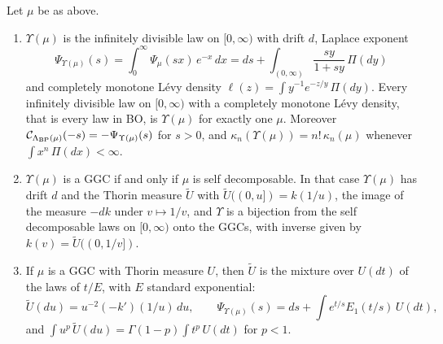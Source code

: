 \begin{proposition}\label{prop:wigfree:ups}
Let $\mu$ be as above.
\begin{enumerate}
\item[(a)] $\Upsilon(\mu)$ is the infinitely divisible law on $[0,\infty)$ with drift $d$, Laplace exponent
\begin{equation}\label{eq:wigfree:upspsi}
\Psi_{\Upsilon(\mu)}(s)=\int_0^\infty\Psi_\mu(sx)\,e^{-x}\,dx=ds+\int_{(0,\infty)}\frac{sy}{1+sy}\,\Pi(dy)
\end{equation}
and completely monotone L\'evy density $\ell(z)=\int y^{-1}e^{-z/y}\,\Pi(dy)$. Every infinitely divisible law on $[0,\infty)$ with a completely monotone L\'evy density, that is every law in BO, is $\Upsilon(\mu)$ for exactly one $\mu$. Moreover $\mathcal C_{\Lambda_{\rm BP}(\mu)}(-s)=-\Psi_{\Upsilon(\mu)}(s)$ for $s>0$, and $\kappa_n(\Upsilon(\mu))=n!\,\kappa_n(\mu)$ whenever $\int x^n\,\Pi(dx)<\infty$.
\item[(b)] $\Upsilon(\mu)$ is a GGC if and only if $\mu$ is self decomposable. In that case $\Upsilon(\mu)$ has drift $d$ and the Thorin measure $\widetilde U$ with $\widetilde U((0,u])=k(1/u)$, the image of the measure $-dk$ under $v\mapsto1/v$, and $\Upsilon$ is a bijection from the self decomposable laws on $[0,\infty)$ onto the GGCs, with inverse given by $k(v)=\widetilde U((0,1/v])$.
\item[(c)] If $\mu$ is a GGC with Thorin measure $U$, then $\widetilde U$ is the mixture over $U(dt)$ of the laws of $t/E$, with $E$ standard exponential:
\begin{equation}\label{eq:wigfree:utilde}
\widetilde U(du)=u^{-2}(-k')(1/u)\,du,\qquad\Psi_{\Upsilon(\mu)}(s)=ds+\int e^{t/s}E_1(t/s)\,U(dt),
\end{equation}
and $\int u^p\,\widetilde U(du)=\Gamma(1-p)\int t^p\,U(dt)$ for $p<1$.
\end{enumerate}
\end{proposition}


